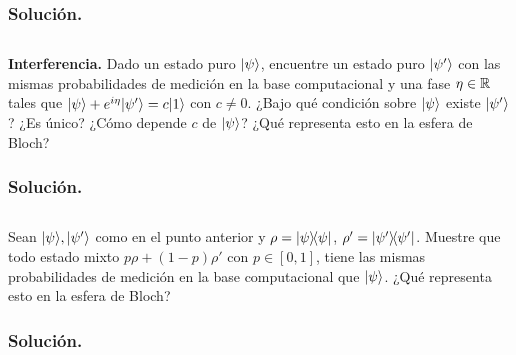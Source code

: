 \documentclass[12pt]{article}
\begin{document}
\color{Black}

\subsubsection*{Solución.}




\color{rojoUN}

\subsection{}

\textbf{Interferencia.} Dado un estado puro $\lvert \psi\rangle$, encuentre un estado puro $\lvert \psi'\rangle$ con las mismas probabilidades de medición en la base computacional y una fase $\eta \in \mathbb{R}$ tales que $\lvert \psi\rangle + e^{i\eta}\lvert \psi'\rangle = c\lvert 1\rangle$ con $c \neq 0$. ¿Bajo qué condición sobre $\lvert \psi\rangle$ existe $\lvert \psi'\rangle$? ¿Es único? ¿Cómo depende $c$ de $\lvert \psi\rangle$? ¿Qué representa esto en la esfera de Bloch?

\color{Black}

\subsubsection*{Solución.}




\color{rojoUN}

\subsection{}

Sean $\lvert \psi\rangle, \lvert \psi'\rangle$ como en el punto anterior y $\rho = \ketbra{\psi}{\psi}$, $\rho' = \ketbra{\psi'}{\psi'}$. Muestre que todo estado mixto $p\rho + (1-p)\rho'$ con $p \in [0,1]$, tiene las mismas probabilidades de medición en la base computacional que $\lvert \psi\rangle$. ¿Qué representa esto en la esfera de Bloch?

\color{Black}

\subsubsection*{Solución.}

\end{document}
